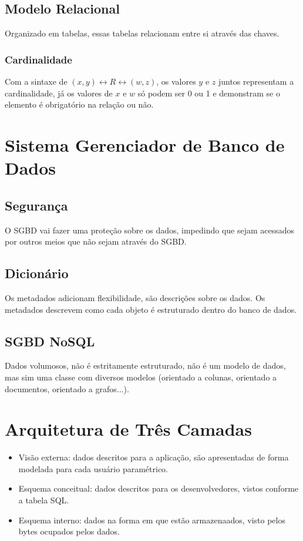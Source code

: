 \documentclass[ ]{article}
\begin{document}
		\subsection{Modelo Relacional}
			Organizado em tabelas, essas tabelas relacionam entre si através das chaves.
		\subsubsection{Cardinalidade}
			Com a sintaxe de $(x,y) \leftrightarrow R \leftrightarrow (w,z)$, os valores $y$ e $z$ juntos representam a cardinalidade, já os valores de $x$ e $w$ só podem ser 0 ou 1 e demonstram se o elemento é obrigatório na relação ou não.
	\section{Sistema Gerenciador de Banco de Dados}
		\subsection{Segurança}
			O SGBD vai fazer uma proteção sobre os dados, impedindo que sejam acessados por outros meios que não sejam através do SGBD.
		\subsection{Dicionário}
			Os metadados adicionam flexibilidade, são descrições sobre os dados. Os metadados descrevem como cada objeto é estruturado dentro do banco de dados.
		\subsection{SGBD NoSQL}
			Dados volumosos, não é estritamente estruturado, não é um modelo de dados, mas sim uma classe com diversos modelos (orientado a colunas, orientado a documentos, orientado a grafos...).
	\section{Arquitetura de Três Camadas}
		\begin{itemize}
			\item Visão externa: dados descritos para a aplicação, são apresentadas de forma modelada para cada usuário paramétrico.
			\item Esquema conceitual: dados descritos para os desenvolvedores, vistos conforme a tabela SQL.
			\item Esquema interno:	 dados na forma em que estão armazenaados, visto pelos bytes ocupados pelos dados.
		\end{itemize}
\end{document}
